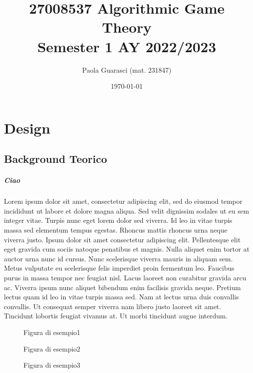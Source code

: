 \documentclass[a4]{report}
\title{27008537 Algorithmic Game Theory \\ \normalsize Semester 1 AY 2022/2023}
\author{Paola Guarasci (mat. 231847)}
\date{\today}
\begin{document}
\maketitle

\tableofcontents


\chapter{Design}
\section{Background Teorico}
\paragraph{Ciao}
Lorem ipsum dolor sit amet, consectetur adipiscing elit, sed do eiusmod tempor incididunt ut labore et dolore magna aliqua. Sed velit dignissim sodales ut eu sem integer vitae. Turpis nunc eget lorem dolor sed viverra. Id leo in vitae turpis massa sed elementum tempus egestas. Rhoncus mattis rhoncus urna neque viverra justo. Ipsum dolor sit amet consectetur adipiscing elit. Pellentesque elit eget gravida cum sociis natoque penatibus et magnis. Nulla aliquet enim tortor at auctor urna nunc id cursus. Nunc scelerisque viverra mauris in aliquam sem. Metus vulputate eu scelerisque felis imperdiet proin fermentum leo. Faucibus purus in massa tempor nec feugiat nisl. Lacus laoreet non curabitur gravida arcu ac. Viverra ipsum nunc aliquet bibendum enim facilisis gravida neque. Pretium lectus quam id leo in vitae turpis massa sed. Nam at lectus urna duis convallis convallis. Ut consequat semper viverra nam libero justo laoreet sit amet. Tincidunt lobortis feugiat vivamus at. Ut morbi tincidunt augue interdum.

\begin{figure}
  \centering
  \caption{Figura di esempio1}\label{fig:1}
  \par
\end{figure}

\begin{figure}
  \centering
  \caption{Figura di esempio2}\label{fig:2}
  \par
\end{figure}
\begin{figure}
  \centering
  \caption{Figura di esempio3}\label{fig:3}
  \par
\end{figure}
\end{document}
